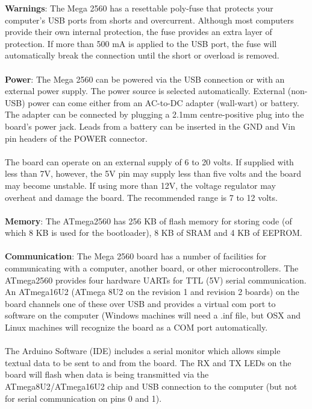 \begin{enumerate}
\textbf{Warnings}: The Mega 2560 has a resettable poly-fuse that protects your computer's USB ports from shorts and overcurrent. Although most computers provide their own internal protection, the fuse provides an extra layer of protection. If more than 500 mA is applied to the USB port, the fuse will automatically break the connection until the short or overload is removed.
\\
\\
\textbf{Power}: The Mega 2560 can be powered via the USB connection or with an external power supply. The power source is selected automatically. External (non-USB) power can come either from an AC-to-DC adapter (wall-wart) or battery. The adapter can be connected by plugging a 2.1mm centre-positive plug into the board's power jack. Leads from a battery can be inserted in the GND and Vin pin headers of the POWER connector.
\\
\\
The board can operate on an external supply of 6 to 20 volts. If supplied with less than 7V, however, the 5V pin may supply less than five volts and the board may become unstable. If using more than 12V, the voltage regulator may overheat and damage the board. The recommended range is 7 to 12 volts.
\\
\\
\textbf{Memory}: The ATmega2560 has 256 KB of flash memory for storing code (of which 8 KB is used for the bootloader), 8 KB of SRAM and 4 KB of EEPROM.
\\
\\
\textbf{Communication}: The Mega 2560 board has a number of facilities for communicating with a computer, another board, or other microcontrollers. The ATmega2560 provides four hardware UARTs for TTL (5V) serial communication. An ATmega16U2 (ATmega 8U2 on the revision 1 and revision 2 boards) on the board channels one of these over USB and provides a virtual com port to software on the computer (Windows machines will need a .inf file, but OSX and Linux machines will recognize the board as a COM port automatically.
\\
\\
 The Arduino Software (IDE) includes a serial monitor which allows simple textual data to be sent to and from the board. The RX and TX LEDs on the board will flash when data is being transmitted via the ATmega8U2/ATmega16U2 chip and USB connection to the computer (but not for serial communication on pins 0 and 1).


\end{enumerate}
